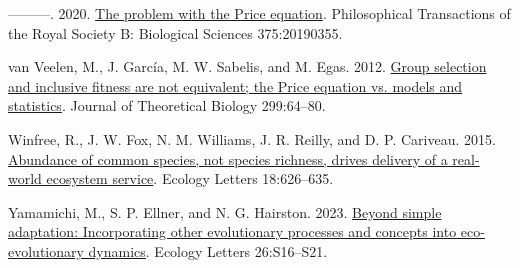 \documentclass[
]{article}
\newlength{\cslhangindent}
\newenvironment{CSLReferences}[2] %
 {\begin{list}{}{%
  \setlength{\itemindent}{0pt}
  \setlength{\leftmargin}{0pt}
  \setlength{\parsep}{0pt}
  \ifodd #1
   \setlength{\leftmargin}{\cslhangindent}
   \setlength{\itemindent}{-1\cslhangindent}
  \fi
  \setlength{\itemsep}{#2\baselineskip}}}
 {\end{list}}
\begin{document}
\begin{CSLReferences}{0}{0}
---------. 2020. \href{https://doi.org/10.1098/rstb.2019.0355}{{The
problem with the Price equation}}. Philosophical Transactions of the
Royal Society B: Biological Sciences 375:20190355.

van Veelen, M., J. García, M. W. Sabelis, and M. Egas. 2012.
\href{https://doi.org/10.1016/j.jtbi.2011.07.025}{{Group selection and
inclusive fitness are not equivalent; the Price equation vs. models and
statistics}}. Journal of Theoretical Biology 299:64--80.

Winfree, R., J. W. Fox, N. M. Williams, J. R. Reilly, and D. P.
Cariveau. 2015. \href{https://doi.org/10.1111/ele.12424}{{Abundance of
common species, not species richness, drives delivery of a real-world
ecosystem service}}. Ecology Letters 18:626--635.

Yamamichi, M., S. P. Ellner, and N. G. Hairston. 2023.
\href{https://doi.org/10.1111/ele.14197}{Beyond simple adaptation:
Incorporating other evolutionary processes and concepts into
eco-evolutionary dynamics}. Ecology Letters 26:S16--S21.

\end{CSLReferences}
\end{document}
